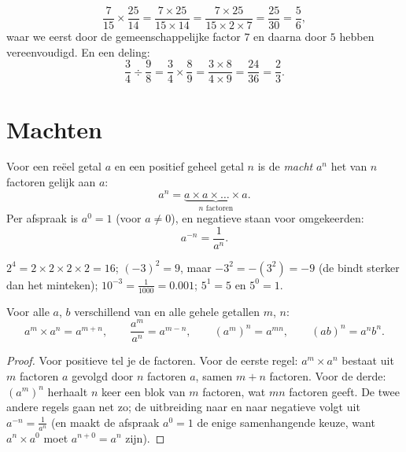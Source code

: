 \begin{example}\label{ex:g9:fractions:mult}
\[
\frac{7}{15} \times \frac{25}{14}
= \frac{7 \times 25}{15 \times 14}
= \frac{7 \times 25}{15 \times 2 \times 7}
= \frac{25}{30} = \frac56,
\]
waar we eerst door de gemeenschappelijke factor $7$ en daarna door $5$ hebben
vereenvoudigd. En een deling:
\[
\frac{3}{4} \div \frac{9}{8}
= \frac34 \times \frac89
= \frac{3 \times 8}{4 \times 9}
= \frac{24}{36} = \frac23 .
\]
\end{example}

\section{Machten}

\begin{definition}[Macht]\label{def:g9:fractions:power}
Voor een reëel getal $a$ en een positief geheel getal $n$ is de
\emph{macht} $a^n$ het  van $n$ factoren gelijk aan $a$:
\[
a^n = \underbrace{a \times a \times \dots \times a}_{n \text{ factoren}} .
\]
Per afspraak is $a^0 = 1$ (voor $a \neq 0$), en negatieve  staan voor
omgekeerden:
\[
a^{-n} = \frac{1}{a^n}.
\]
\end{definition}

\begin{example}
$2^4 = 2 \times 2 \times 2 \times 2 = 16$; \quad
$(-3)^2 = 9$, maar $-3^2 = -(3^2) = -9$ (de  bindt sterker dan het
minteken); \quad $10^{-3} = \frac{1}{1000} = 0.001$; \quad
$5^1 = 5$ en $5^0 = 1$.
\end{example}

\begin{theorem}\label{thm:g9:fractions:rules}
Voor alle $a$, $b$ verschillend van  en alle gehele getallen $m$, $n$:
\[
a^m \times a^n = a^{m+n},
\qquad
\frac{a^m}{a^n} = a^{m-n},
\qquad
\left(a^m\right)^n = a^{mn},
\qquad
(ab)^n = a^n b^n .
\]
\end{theorem}

\begin{proof}
Voor positieve  tel je de factoren. Voor de eerste regel: $a^m \times
a^n$ bestaat uit $m$ factoren $a$ gevolgd door $n$ factoren $a$, samen $m + n$
factoren. Voor de derde: $\left(a^m\right)^n$ herhaalt $n$ keer een blok van $m$
factoren, wat $mn$ factoren geeft. De twee andere regels gaan net zo; de
uitbreiding naar  en naar negatieve  volgt uit
$a^{-n} = \frac{1}{a^n}$ (en maakt de afspraak $a^0 = 1$ de enige samenhangende
keuze, want $a^n \times a^0$ moet $a^{n+0} = a^n$ zijn).
\end{proof}


